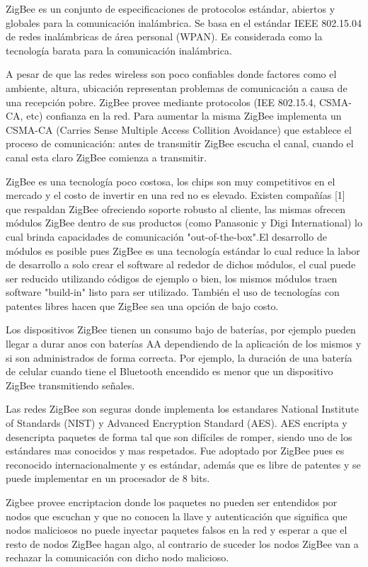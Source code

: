 \documentclass[10pt,journal,compsoc]{IEEEtran}
\begin{document}
ZigBee es  un conjunto de especificaciones de protocolos estándar, abiertos y globales para la comunicación inalámbrica. Se basa en el estándar IEEE 802.15.04 de redes inalámbricas de área personal (WPAN). Es considerada como la tecnología barata para la comunicación inalámbrica.

A pesar de que las redes wireless son poco confiables donde factores como el ambiente, altura, ubicación representan problemas de comunicación a causa de una recepción pobre. ZigBee provee mediante protocolos (IEE 802.15.4, CSMA-CA, etc) confianza en la red. Para aumentar la misma ZigBee implementa un CSMA-CA (Carries Sense Multiple Access Collition Avoidance) que establece el proceso de comunicación: antes de transmitir ZigBee escucha el canal, cuando el canal esta claro ZigBee comienza a transmitir.

ZigBee es una tecnología poco costosa, los chips son muy competitivos en el mercado y el costo de invertir en una red no es elevado. Existen compañías [1] que respaldan ZigBee ofreciendo soporte robusto al cliente, las mismas ofrecen módulos ZigBee dentro de sus productos (como Panasonic y Digi International) lo cual brinda capacidades de comunicación "out-of-the-box".El desarrollo de módulos es posible pues ZigBee es una tecnología estándar lo cual reduce la labor de desarrollo a solo crear el software al rededor de dichos módulos, el cual puede ser reducido utilizando códigos de ejemplo o bien, los mismos módulos traen software "build-in" listo para ser utilizado. También el uso de tecnologías con patentes libres hacen que  ZigBee sea una opción de bajo costo.

Los dispositivos ZigBee tienen un consumo bajo de baterías, por ejemplo pueden llegar a durar anos con baterías AA dependiendo de la aplicación de los mismos y si son administrados de forma correcta. Por ejemplo, la duración de una batería de celular cuando tiene el Bluetooth encendido es menor que un dispositivo ZigBee transmitiendo señales. 

Las redes ZigBee son seguras donde implementa los estandares National Institute of Standards (NIST) y Advanced Encryption Standard (AES). AES encripta y desencripta paquetes de forma tal que son difíciles de romper, siendo uno de los estándares mas conocidos y mas respetados. Fue adoptado por ZigBee pues es reconocido internacionalmente y es estándar, además que es libre de patentes y se puede implementar en un procesador de 8 bits. 

Zigbee provee encriptacion donde los paquetes no pueden ser entendidos por nodos que escuchan y que no conocen la llave y autenticación que significa que nodos maliciosos no puede inyectar paquetes falsos en la red y esperar a que el resto de nodos ZigBee hagan algo, al contrario de suceder los nodos ZigBee van a rechazar la comunicación con dicho nodo malicioso.
 
\end{document}
